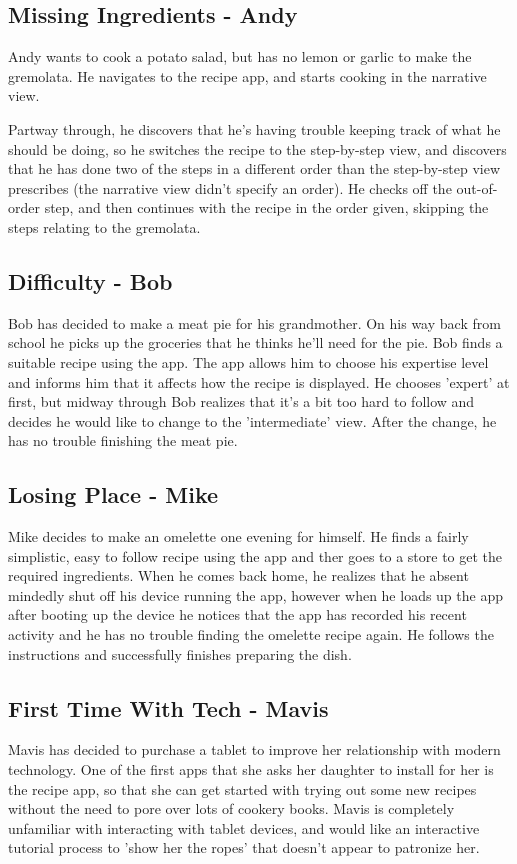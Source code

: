 \documentclass{article}
\begin{document}
\subsection*{Missing Ingredients - Andy}
Andy wants to cook a potato salad, but has no lemon or garlic to make the
gremolata. He navigates to the recipe app, and starts cooking in the narrative
view.

Partway through, he discovers that he's having trouble keeping track of what he
should be doing, so he switches the recipe to the step-by-step view, and
discovers that he has done two of the steps in a different order than the 
step-by-step view prescribes (the narrative view didn't specify an order). He
checks off the out-of-order step, and then continues with the recipe in the
order given, skipping the steps relating to the gremolata.

\subsection*{Difficulty - Bob}
Bob has decided to make a meat pie for his grandmother. On his way back from 
school he picks up the groceries that he thinks he'll need for the pie. Bob finds
a suitable recipe using the app. The app allows him to choose his expertise level
and informs him that it affects how the recipe is displayed. He chooses 'expert'
at first, but midway through Bob realizes that it's a bit too hard to follow and
decides he would like to change to the 'intermediate' view. After the change, he
has no trouble finishing the meat pie.

\subsection*{Losing Place - Mike}
Mike decides to make an omelette one evening for himself. He finds a fairly 
simplistic, easy to follow recipe using the app and ther goes to a store to get
the required ingredients. When he comes back home, he realizes that he absent
mindedly shut off his device running the app, however when he loads up the 
app after booting up the device he notices that the app has recorded his 
recent activity and he has no trouble finding the omelette recipe again. He
follows the instructions and successfully finishes preparing the dish.

\subsection*{First Time With Tech - Mavis}
Mavis has decided to purchase a tablet to improve her relationship with modern
technology. One of the first apps that she asks her daughter to install for her
is the recipe app, so that she can get started with trying out some new recipes
without the need to pore over lots of cookery books. Mavis is completely 
unfamiliar with interacting with tablet devices, and would like an interactive 
tutorial process to 'show her the ropes' that doesn't appear to patronize her.
\end{document}
